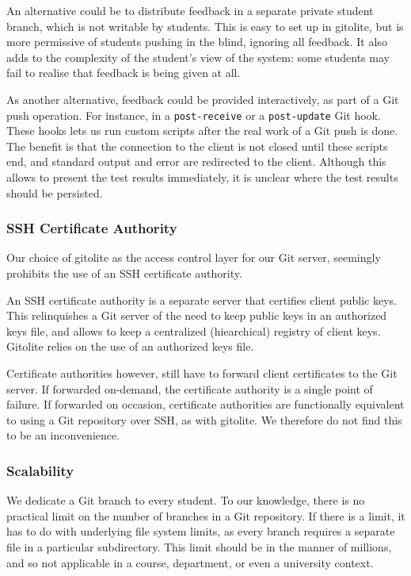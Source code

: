 An alternative could be to distribute feedback in a separate private student
branch, which is not writable by students. This is easy to set up in gitolite,
but is more permissive of students pushing in the blind, ignoring all feedback.
It also adds to the complexity of the student's view of the system: some
students may fail to realise that feedback is being given at all.

As another alternative, feedback could be provided interactively, as part of a
Git push operation. For instance, in a \texttt{post-receive} or a
\texttt{post-update} Git hook. These hooks lets us run custom scripts after the
real work of a Git push is done. The benefit is that the connection to the
client is not closed until these scripts end, and standard output and error are
redirected to the client\cite{man-5-githooks}. Although this allows to present
the test results immediately, it is unclear where the test results should be
persisted.

\subsubsection{SSH Certificate Authority}

\label{section:gitolite-ssh-certificate-authority}

Our choice of gitolite as the access control layer for our Git server,
seemingly prohibits the use of an SSH certificate authority.

An SSH certificate authority is a separate server that certifies client public
keys.  This relinquishes a Git server of the need to keep public keys in an
authorized keys file, and allows to keep a centralized (hiearchical) registry
of client keys. Gitolite relies on the use of an authorized keys file.

Certificate authorities however, still have to forward client certificates to
the Git server. If forwarded on-demand, the certificate authority is a single
point of failure. If forwarded on occasion, certificate authorities are
functionally equivalent to using a Git repository over SSH, as with gitolite.
We therefore do not find this to be an inconvenience.

\subsubsection{Scalability}

We dedicate a Git branch to every student. To our knowledge, there is no
practical limit on the number of branches in a Git repository. If there is a
limit, it has to do with underlying file system limits, as every branch
requires a separate file in a particular subdirectory. This limit should be in
the manner of millions, and so not applicable in a course, department, or even
a university context.

